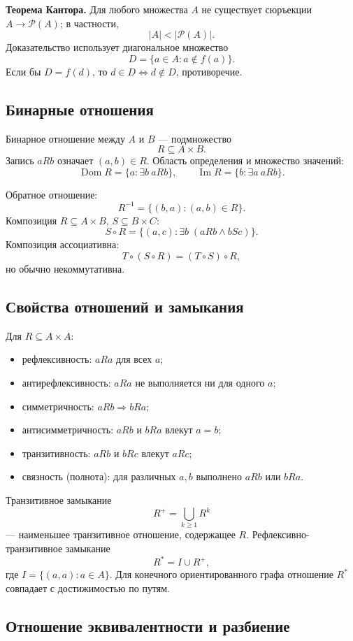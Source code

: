 \textbf{Теорема Кантора.} Для любого множества $A$ не существует сюръекции
$A\to\mathcal P(A)$; в частности,
\[
    |A|<|\mathcal P(A)|.
\]
Доказательство использует диагональное множество
\[
    D=\{a\in A:a\notin f(a)\}.
\]
Если бы $D=f(d)$, то $d\in D\iff d\notin D$, противоречие.

\subsection{Бинарные отношения}

Бинарное отношение между $A$ и $B$ --- подмножество
\[
    R\subseteq A\times B.
\]
Запись $aRb$ означает $(a,b)\in R$. Область определения и множество значений:
\[
 \operatorname{Dom}R=\{a:\exists b\ aRb\},
 \qquad
 \operatorname{Im}R=\{b:\exists a\ aRb\}.
\]

Обратное отношение:
\[
    R^{-1}=\{(b,a):(a,b)\in R\}.
\]
Композиция $R\subseteq A\times B$, $S\subseteq B\times C$:
\[
 S\circ R=\{(a,c):\exists b\;(aRb\land bSc)\}.
\]
Композиция ассоциативна:
\[
    T\circ(S\circ R)=(T\circ S)\circ R,
\]
но обычно некоммутативна.

\subsection{Свойства отношений и замыкания}

Для $R\subseteq A\times A$:
\begin{itemize}
 \item рефлексивность: $aRa$ для всех $a$;
 \item антирефлексивность: $aRa$ не выполняется ни для одного $a$;
 \item симметричность: $aRb\Rightarrow bRa$;
 \item антисимметричность: $aRb$ и $bRa$ влекут $a=b$;
 \item транзитивность: $aRb$ и $bRc$ влекут $aRc$;
 \item связность (полнота): для различных $a,b$ выполнено $aRb$ или $bRa$.
\end{itemize}

Транзитивное замыкание
\[
    R^+=\bigcup_{k\ge1}R^k
\]
--- наименьшее транзитивное отношение, содержащее $R$. Рефлексивно-транзитивное
замыкание
\[
    R^*=I\cup R^+,
\]
где $I=\{(a,a):a\in A\}$. Для конечного ориентированного графа отношение
$R^*$ совпадает с достижимостью по путям.

\subsection{Отношение эквивалентности и разбиение}

